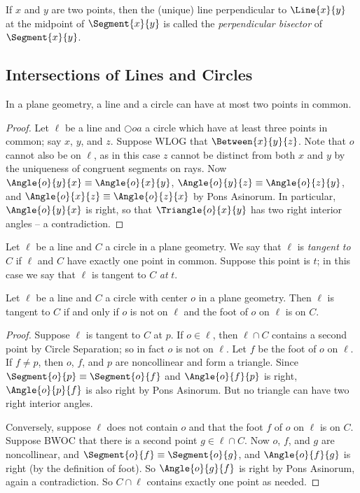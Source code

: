 \documentclass{article}
\begin{document}
\begin{dfn}
If $x$ and $y$ are two points, then the (unique) line perpendicular to $\Line{x}{y}$ at the midpoint of $\Segment{x}{y}$ is called the \emph{perpendicular bisector} of $\Segment{x}{y}$.
\end{dfn}

\subsection*{Intersections of Lines and Circles}

\begin{prop}
In a plane geometry, a line and a circle can have at most two points in common.
\end{prop}

\begin{proof}
Let $\ell$ be a line and $\Circle{o}{a}$ a circle which have at least three points in common; say $x$, $y$, and $z$. Suppose WLOG that $\Between{x}{y}{z}$. Note that $o$ cannot also be on $\ell$, as in this case $z$ cannot be distinct from both $x$ and $y$ by the uniqueness of congruent segments on rays. Now $\Angle{o}{y}{x} \equiv \Angle{o}{x}{y}$, $\Angle{o}{y}{z} \equiv \Angle{o}{z}{y}$, and $\Angle{o}{x}{z} \equiv \Angle{o}{z}{x}$ by Pons Asinorum. In particular, $\Angle{o}{y}{x}$ is right, so that $\Triangle{o}{x}{y}$ has two right interior angles -- a contradiction.
\end{proof}

\begin{dfn}[Tangent]
Let $\ell$ be a line and $C$ a circle in a plane geometry. We say that $\ell$ is \emph{tangent to} $C$ if $\ell$ and $C$ have exactly one point in common. Suppose this point is $t$; in this case we say that $\ell$ is tangent to $C$ \emph{at} $t$. 
\end{dfn}

\begin{prop}
Let $\ell$ be a line and $C$ a circle with center $o$ in a plane geometry. Then $\ell$ is tangent to $C$ if and only if $o$ is not on $\ell$ and the foot of $o$ on $\ell$ is on $C$.
\end{prop}

\begin{proof}
Suppose $\ell$ is tangent to $C$ at $p$. If $o \in \ell$, then $\ell \cap C$ contains a second point by Circle Separation; so in fact $o$ is not on $\ell$. Let $f$ be the foot of $o$ on $\ell$. If $f \neq p$, then $o$, $f$, and $p$ are noncollinear and form a triangle. Since $\Segment{o}{p} \equiv \Segment{o}{f}$ and $\Angle{o}{f}{p}$ is right, $\Angle{o}{p}{f}$ is also right by Pons Asinorum. But no triangle can have two right interior angles.

Conversely, suppose $\ell$ does not contain $o$ and that the foot $f$ of $o$ on $\ell$ is on $C$. Suppose BWOC that there is a second point $g \in \ell \cap C$. Now $o$, $f$, and $g$ are noncollinear, and $\Segment{o}{f} \equiv \Segment{o}{g}$, and $\Angle{o}{f}{g}$ is right (by the definition of foot). So $\Angle{o}{g}{f}$ is right by Pons Asinorum, again a contradiction. So $C \cap \ell$ contains exactly one point as needed. 
\end{proof}
\end{document}
